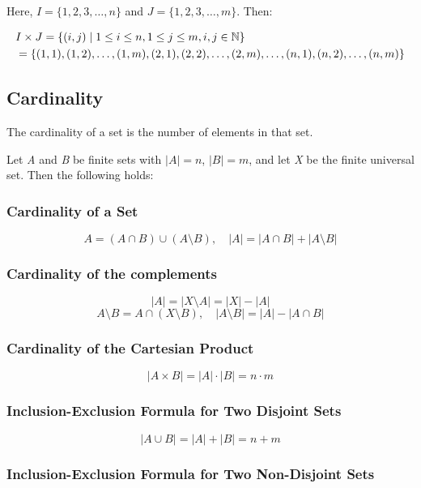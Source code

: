 Here, \( I = \{ 1, 2, 3, \dots, n \} \) and \( J = \{ 1, 2, 3, \dots, m \} \). Then:

\begin{align*}
&I \times J = \{ (i, j) \mid 1 \leq i \leq n, 1 \leq j \leq m, i, j \in \mathbb{N} \} \\
&= \{ (1, 1), (1, 2), \dots, (1, m), (2, 1), (2, 2), \dots, (2, m), \dots, (n, 1), (n, 2), \dots, (n, m) \}
\end{align*}

\subsection{Cardinality}

The cardinality of a set is the number of elements in that set.
\vspace{\baselineskip}

Let \emph{A} and \emph{B} be finite sets with \( |A| = n \), \( |B| = m \), and let \emph{X} be the finite 
universal set. Then the following holds:

\subsubsection{Cardinality of a Set}

\[
	A = (A \cap B) \cup (A \setminus B), \quad |A| = |A \cap B| + |A \setminus B|
\]

\subsubsection{Cardinality of the complements}

\[
	|A| = |X \setminus A| = |X| - |A|
\]
\[
	A \setminus B = A \cap (X \setminus B), \quad |A \setminus B| = |A| - |A \cap B|
\]

\subsubsection{Cardinality of the Cartesian Product}

\[
	|A \times B| = |A| \cdot |B| = n \cdot m
\]

\subsubsection{Inclusion-Exclusion Formula for Two Disjoint Sets}

\[
	|A \cup B| = |A| + |B| = n + m
\]

\subsubsection{Inclusion-Exclusion Formula for Two Non-Disjoint Sets}

